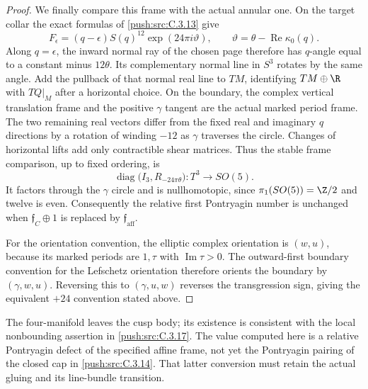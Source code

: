\begin{proof}
We finally compare this frame with the actual annular one.
On the target collar the exact formulas of \ref{push:src:C.3.13} give
\[
 F_\epsilon=(q-\epsilon)S(q)^{12}
              \exp(24\pi i\vartheta),
 \qquad\vartheta=\theta-\operatorname{Re}\kappa_0(q).
\]
Along $q=\epsilon$, the inward normal ray of the chosen page
therefore has $q$-angle equal to a constant minus $12\theta$.
Its complementary normal line in $S^3$ rotates by the same
angle. Add the pullback of that normal real line to $TM$,
identifying $TM\oplus\R$ with $TQ|_M$ after a horizontal
choice. On the boundary, the complex vertical translation
frame and the positive $\gamma$ tangent are the actual marked
period frame. The two remaining real vectors differ from
the fixed real and imaginary $q$ directions by a rotation
of winding $-12$ as $\gamma$ traverses the circle. Changes
of horizontal lifts add only contractible shear matrices.
Thus the stable frame comparison, up to fixed ordering, is
\[
 \operatorname{diag}\bigl(I_3,R_{-24\pi\theta}\bigr):
 T^3\longrightarrow SO(5).
\]
It factors through the $\gamma$ circle and is nullhomotopic,
since $\pi_1(SO(5))=\Z/2$ and twelve is even. Consequently
the relative first Pontryagin number is unchanged when
$\mathfrak f_C\oplus1$ is replaced by
$\mathfrak f_{\mathrm{aff}}$.

For the orientation convention, the elliptic complex orientation
is $(w,u)$, because its marked periods are $1,\tau$ with
$\operatorname{Im}\tau>0$. The outward-first boundary convention
for the Lefschetz orientation therefore orients the boundary
by $(\gamma,w,u)$. Reversing this to $(\gamma,u,w)$ reverses
the transgression sign, giving the equivalent $+24$ convention
stated above.
\end{proof}

\begin{remark}[Scope]
The four-manifold leaves the cusp body; its existence is
consistent with the local nonbounding assertion in \ref{push:src:C.3.17}.
The value computed here is a relative Pontryagin defect of
the specified affine frame, not yet the Pontryagin pairing
of the closed cap in \ref{push:src:C.3.14}. That latter conversion must
retain the actual gluing and its line-bundle transition.
\end{remark}
